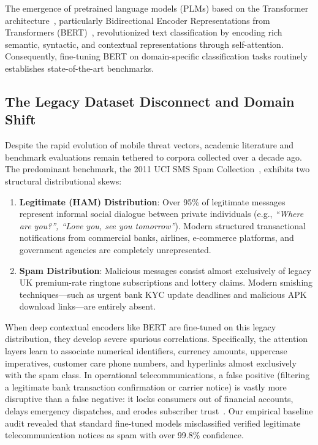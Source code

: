\documentclass[conference]{IEEEtran}
\begin{document}
The emergence of pretrained language models (PLMs) based on the Transformer architecture~\cite{vaswani2017attention}, particularly Bidirectional Encoder Representations from Transformers (BERT)~\cite{devlin2019bert}, revolutionized text classification by encoding rich semantic, syntactic, and contextual representations through self-attention. Consequently, fine-tuning BERT on domain-specific classification tasks routinely establishes state-of-the-art benchmarks.

\subsection{The Legacy Dataset Disconnect and Domain Shift}
Despite the rapid evolution of mobile threat vectors, academic literature and benchmark evaluations remain tethered to corpora collected over a decade ago. The predominant benchmark, the 2011 UCI SMS Spam Collection~\cite{almeida2011sms}, exhibits two structural distributional skews:
\begin{enumerate}
    \item \textbf{Legitimate (HAM) Distribution}: Over 95\% of legitimate messages represent informal social dialogue between private individuals (e.g., \textit{``Where are you?'', ``Love you, see you tomorrow''}). Modern structured transactional notifications from commercial banks, airlines, e-commerce platforms, and government agencies are completely unrepresented.
    \item \textbf{Spam Distribution}: Malicious messages consist almost exclusively of legacy UK premium-rate ringtone subscriptions and lottery claims. Modern smishing techniques—such as urgent bank KYC update deadlines and malicious APK download links—are entirely absent.
\end{enumerate}

When deep contextual encoders like BERT are fine-tuned on this legacy distribution, they develop severe spurious correlations. Specifically, the attention layers learn to associate numerical identifiers, currency amounts, uppercase imperatives, customer care phone numbers, and hyperlinks almost exclusively with the spam class. In operational telecommunications, a false positive (filtering a legitimate bank transaction confirmation or carrier notice) is vastly more disruptive than a false negative: it locks consumers out of financial accounts, delays emergency dispatches, and erodes subscriber trust~\cite{delany2012sms}. Our empirical baseline audit revealed that standard fine-tuned models misclassified verified legitimate telecommunication notices as spam with over 99.8\% confidence.
\end{document}
